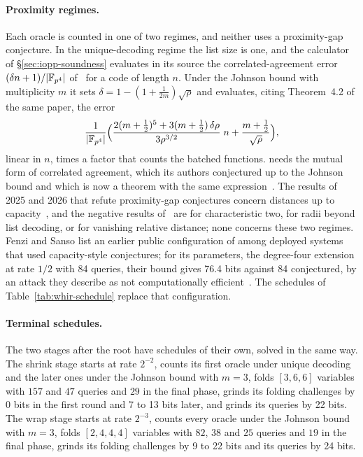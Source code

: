 \paragraph{Proximity regimes.} Each oracle is counted in one of two regimes, and neither uses a proximity-gap conjecture. In the unique-decoding regime the list size is one, and the calculator of \S\ref{sec:iopp-soundness} evaluates in its source the correlated-agreement error $(\delta n + 1)/|\mathbb{F}_{p^4}|$ of~\citep[Cor.~1.4]{proximity-gaps-2025} for a code of length $n$. Under the Johnson bound with multiplicity $m$ it sets $\delta = 1 - (1 + \tfrac{1}{2m})\sqrt\rho$ and evaluates, citing Theorem~4.2 of the same paper, the error
\[
  \frac{1}{|\mathbb{F}_{p^4}|}\Big(\frac{2(m+\tfrac12)^5 + 3(m+\tfrac12)\,\delta\rho}{3\rho^{3/2}}\; n + \frac{m+\tfrac12}{\sqrt\rho}\Big),
\]
linear in $n$, times a factor that counts the batched functions. \WHIR{} needs the mutual form of correlated agreement, which its authors conjectured up to the Johnson bound and which is now a theorem with the same expression~\citep[Thm.~4.6 and \S4.3]{proximity-gaps-2025}. The results of 2025 and 2026 that refute proximity-gap conjectures concern distances up to capacity~\citep{cs25}, and the negative results of~\citep{proximity-gaps-2025} are for characteristic two, for radii beyond list decoding, or for vanishing relative distance; none concerns these two regimes. Fenzi and Sanso list an earlier public configuration of \Ziren{} among deployed systems that used capacity-style conjectures; for its parameters, the degree-four extension at rate $1/2$ with 84 queries, their bound gives 76.4 bits against 84 conjectured, by an attack they describe as not computationally efficient~\citep[Tables~1 and~2]{fs26}. The schedules of Table~\ref{tab:whir-schedule} replace that configuration.

\paragraph{Terminal schedules.} The two stages after the root have schedules of their own, solved in the same way. The shrink stage starts at rate $2^{-2}$, counts its first oracle under unique decoding and the later ones under the Johnson bound with $m = 3$, folds $[3,6,6]$ variables with $157$ and $47$ queries and $29$ in the final phase, grinds its folding challenges by 0 bits in the first round and 7 to 13 bits later, and grinds its queries by 22 bits. The wrap stage starts at rate $2^{-3}$, counts every oracle under the Johnson bound with $m = 3$, folds $[2,4,4,4]$ variables with $82$, $38$ and $25$ queries and $19$ in the final phase, grinds its folding challenges by 9 to 22 bits and its queries by 24 bits.
